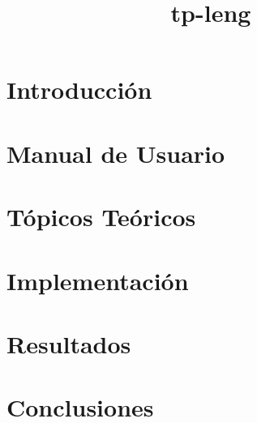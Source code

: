 \documentclass[hidelinks,a4paper,12pt, nofootinbib]{article}
\title{tp-leng}
\begin{document}
\maketitle

\tableofcontents
\newpage


\section{Introducción}

\newpage

\section{Manual de Usuario}

\newpage

\section{Tópicos Teóricos}

\newpage

\section{Implementación}

\newpage

\section{Resultados}

\newpage

\section{Conclusiones}

\newpage

\end{document}
